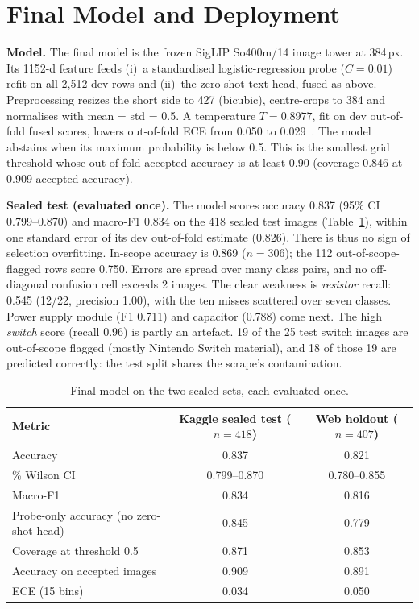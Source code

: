 \documentclass[conference]{IEEEtran}
\begin{document}
\section{Final Model and Deployment}\label{sec:final}
\textbf{Model.} The final model is the frozen SigLIP So400m/14 image tower at 384\,px. Its 1152-d feature feeds
(i)~a standardised logistic-regression probe ($C=0.01$) refit on all 2,512 dev rows and (ii)~the zero-shot text head,
fused as above. Preprocessing resizes the short side to 427 (bicubic), centre-crops to 384 and normalises with
mean = std = 0.5. A temperature $T=0.8977$, fit on dev out-of-fold fused scores, lowers out-of-fold ECE from 0.050 to
0.029~\cite{guo2017calibration}. The model abstains when its maximum probability is below 0.5. This is the smallest
grid threshold whose out-of-fold accepted accuracy is at least 0.90 (coverage 0.846 at 0.909 accepted accuracy).

\textbf{Sealed test (evaluated once).} The model scores accuracy 0.837 (95\% CI 0.799--0.870) and macro-F1 0.834 on
the 418 sealed test images (Table~\ref{tab:sealed}), within one standard error of its dev out-of-fold estimate
(0.826). There is thus no sign of selection overfitting. In-scope accuracy is 0.869 ($n=306$); the 112
out-of-scope-flagged rows score 0.750. Errors are spread over many class pairs, and no off-diagonal confusion cell
exceeds 2 images. The clear weakness is \emph{resistor} recall: 0.545 (12/22, precision 1.00), with the ten misses
scattered over seven classes. Power supply module (F1 0.711) and capacitor (0.788) come next. The high \emph{switch}
score (recall 0.96) is partly an artefact. 19 of the 25 test switch images are out-of-scope flagged (mostly Nintendo
Switch material), and 18 of those 19 are predicted correctly: the test split shares the scrape's contamination.

\begin{table}[t]
\centering\footnotesize
\caption{Final model on the two sealed sets, each evaluated once.}
\label{tab:sealed}
\begin{tabular}{@{}lcc@{}}
\toprule
Metric & \shortstack{Kaggle sealed\\test ($n=418$)} & \shortstack{Web holdout\\($n=407$)} \\
\midrule
Accuracy & 0.837 & 0.821 \\
\quad 95\% Wilson CI & 0.799--0.870 & 0.780--0.855 \\
Macro-F1 & 0.834 & 0.816 \\
Probe-only accuracy (no zero-shot head) & 0.845 & 0.779 \\
Coverage at threshold 0.5 & 0.871 & 0.853 \\
Accuracy on accepted images & 0.909 & 0.891 \\
ECE (15 bins) & 0.034 & 0.050 \\
\bottomrule
\end{tabular}
\end{table}
\end{document}
